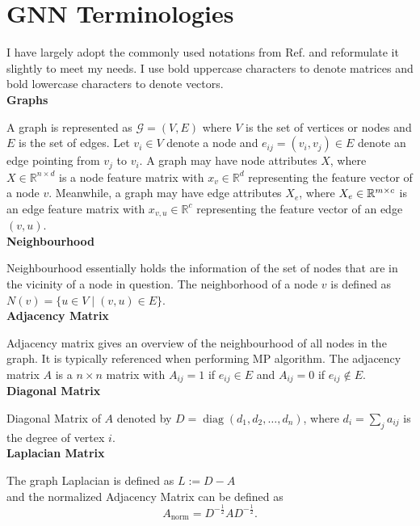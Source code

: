\documentclass{report} %
\begin{document}
\section{GNN Terminologies}
\label{sec:GNN Terminologies}

I have largely adopt the commonly used notations from Ref. \cite{GNN-2019} and reformulate it slightly to meet my needs.
I use bold uppercase characters to denote matrices and bold lowercase characters to denote vectors.\\

\textbf{Graphs}

A graph is represented as \( \mathcal{G} = (V, E) \) where \( V \) is the set of vertices or nodes  and \( E \) is the set of edges. 
Let \( v_i \in V \) denote a node and \( e_{ij} = (v_i, v_j) \in E \) denote an edge pointing from \( v_j \) to \( v_i \).
A graph may have node attributes \( X \), where \( X \in \mathbb{R}^{n \times d} \) is a node feature matrix with 
\( x_v \in \mathbb{R}^d \) representing the feature vector of a node \( v \). 
Meanwhile, a graph may have edge attributes \( X_e \), where \( X_e \in \mathbb{R}^{m \times \\c} \) is an edge
feature matrix with \( x_{v,u} \in \mathbb{R}^c \) representing the feature vector of an edge \( (v, u) \).\\

\textbf{Neighbourhood}

Neighbourhood essentially holds the information of the set of nodes that are in the vicinity of a node in question.
The neighborhood of a node \( v \) is defined as \( N(v) = \{ u \in V \mid (v, u) \in E \} \).\\

\textbf{Adjacency Matrix}

Adjacency matrix gives an overview of the neighbourhood of all nodes in the graph. It is typically referenced when performing \ac{MP} algorithm.
The adjacency matrix \( A \) is a \( n \times n \) matrix with \( A_{ij} = 1 \) if \( e_{ij} \in E \) and \( A_{ij} = 0 \) if \( e_{ij} \notin E \).\\

\textbf{Diagonal Matrix} 

Diagonal Matrix of \( A \) denoted by  \( D = \operatorname{diag}(d_1, d_2, \dots, d_n) \), where \( d_i = \sum_{j} a_{ij} \) is the degree of vertex \( i \).\\

\textbf{Laplacian Matrix}

The graph Laplacian is defined as \( L := D - A \) \\ and the normalized Adjacency Matrix can be defined as
\[
A_{\text{norm}} = D^{-\frac{1}{2}} A D^{-\frac{1}{2}}.
\]
\end{document}
